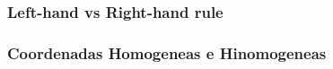 \begin{frame}
    \frametitle{Left-hand vs Right-hand rule}
    \begin{center}
    \end{center}
\end{frame}

\begin{frame}
    \frametitle{Coordenadas Homogeneas e Hinomogeneas}

\end{frame}